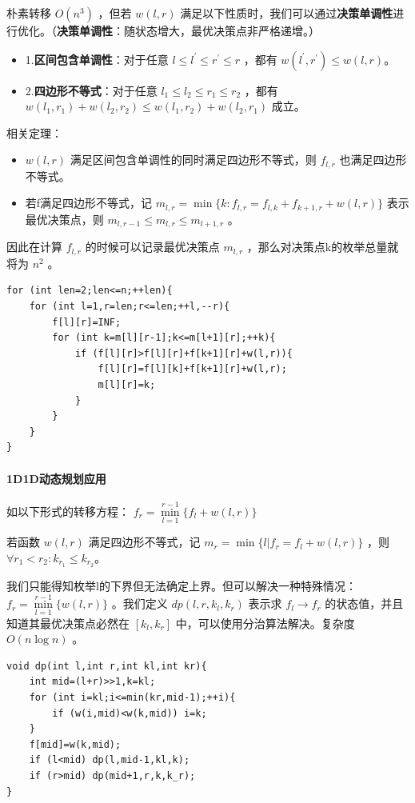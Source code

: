 \documentclass[a4paper,11pt]{article}
\begin{document}
朴素转移 \(O(n^3)\) ，但若 \(w(l,r)\) 满足以下性质时，我们可以通过\textbf{决策单调性}进行优化。（\textbf{决策单调性}：随状态增大，最优决策点非严格递增。）
\begin{itemize}
\item 1.\textbf{区间包含单调性}：对于任意 \(l\le l^{'}\le r^{'}\le r\) ，都有 \(w(l^{'},r^{'})\le w(l,r)\)。
\item 2.\textbf{四边形不等式}：对于任意 \(l_1\le l_2\le r_1\le r_2\) ，都有 \(w(l_1,r_1)+w(l_2,r_2)\le w(l_1,r_2)+w(l_2,r_1)\) 成立。
\end{itemize}

相关定理：
\begin{itemize}
  \item \(w(l,r)\) 满足区间包含单调性的同时满足四边形不等式，则 \(f_{l,r}\) 也满足四边形不等式。
  \item 若f满足四边形不等式，记 \(m_{l,r}=\min\lbrace{k:f_{l,r}=f_{l,k}+f_{k+1,r}+w(l,r)}\rbrace\) 表示最优决策点，则
\(m_{l,r-1}\le m_{l,r}\le m_{l+1,r}\) 。
\end{itemize}

因此在计算 \(f_{l,r}\) 的时候可以记录最优决策点 \(m_{l,r}\) ，那么对决策点k的枚举总量就将为 \(n^2\) 。
\begin{verbatim}
for (int len=2;len<=n;++len){
    for (int l=1,r=len;r<=len;++l,--r){
        f[l][r]=INF;
        for (int k=m[l][r-1];k<=m[l+1][r];++k){
            if (f[l][r]>f[l][r]+f[k+1][r]+w(l,r)){
                f[l][r]=f[l][k]+f[k+1][r]+w(l,r);
                m[l][r]=k;
            }
        }
    }
}
\end{verbatim}
\paragraph{1D1D动态规划应用}

如以下形式的转移方程：
\(f_r=\min\limits_{l=1}^{r-1}\lbrace{f_l+w(l,r)}\rbrace\)

若函数 \(w(l,r)\) 满足四边形不等式，记 \(m_r=\min\lbrace{l|f_r=f_l+w(l,r)}\rbrace\) ，则 
\(\forall r_1<r_2:k_{r_1}\le k_{r_2}\)。

我们只能得知枚举l的下界但无法确定上界。但可以解决一种特殊情况：
\(f_r=\min\limits_{l=1}^{r-1}\lbrace{w(l,r)}\rbrace\) 。我们定义 \(dp(l,r,k_l,k_r)\) 表示求 \(f_l\to f_r\) 的状态值，并且知道其最优决策点必然在 \([k_l,k_r]\) 中，可以使用分治算法解决。复杂度 \(O(n\log n)\) 。

\begin{verbatim}
void dp(int l,int r,int kl,int kr){
    int mid=(l+r)>>1,k=kl;
    for (int i=kl;i<=min(kr,mid-1);++i){
        if (w(i,mid)<w(k,mid)) i=k;
    }
    f[mid]=w(k,mid);
    if (l<mid) dp(l,mid-1,kl,k);
    if (r>mid) dp(mid+1,r,k,k_r);
}
\end{verbatim}
\end{document}
